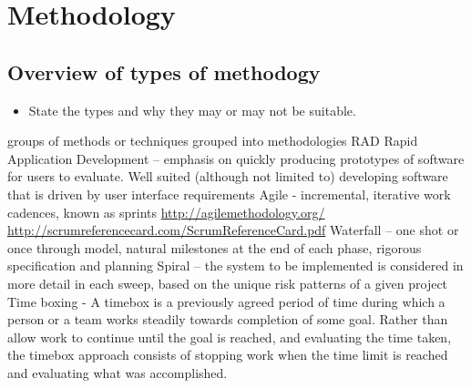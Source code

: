 \section{Methodology}\label{methodology}

\subsection{Overview of types of
methodogy}\label{overview-of-types-of-methodogy}

\begin{itemize}
\tightlist
\item
  State the types and why they may or may not be suitable.
\end{itemize}

groups of methods or techniques grouped into methodologies RAD Rapid
Application Development -- emphasis on quickly producing prototypes of
software for users to evaluate. Well suited (although not limited to)
developing software that is driven by user interface requirements Agile
- incremental, iterative work cadences, known as sprints
\url{http://agilemethodology.org/}
\url{http://scrumreferencecard.com/ScrumReferenceCard.pdf} Waterfall -- one
shot or once through model, natural milestones at the end of each phase,
rigorous specification and planning Spiral -- the system to be
implemented is considered in more detail in each sweep, based on the
unique risk patterns of a given project Time boxing - A timebox is a
previously agreed period of time during which a person or a team works
steadily towards completion of some goal. Rather than allow work to
continue until the goal is reached, and evaluating the time taken, the
timebox approach consists of stopping work when the time limit is
reached and evaluating what was accomplished.
